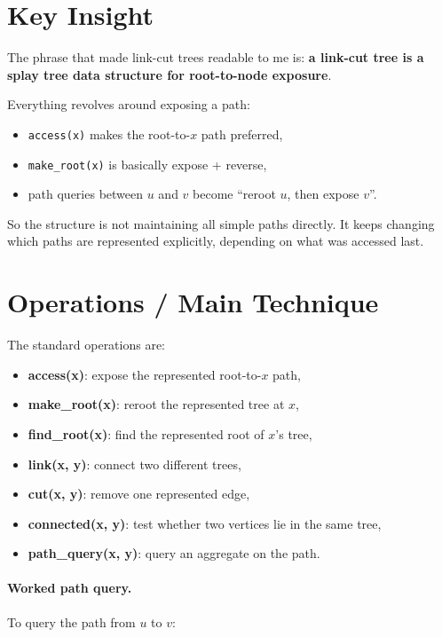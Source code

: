 \section*{Key Insight}

The phrase that made link-cut trees readable to me is:
\textbf{a link-cut tree is a splay tree data structure for root-to-node exposure}.

Everything revolves around exposing a path:

\begin{itemize}
  \item \texttt{access(x)} makes the root-to-\(x\) path preferred,
  \item \texttt{make\_root(x)} is basically expose + reverse,
  \item path queries between \(u\) and \(v\) become ``reroot \(u\), then expose \(v\)''.
\end{itemize}

So the structure is not maintaining all simple paths directly. It keeps changing which paths are represented
explicitly, depending on what was accessed last.

\section*{Operations / Main Technique}

The standard operations are:

\begin{itemize}
  \item \textbf{access(x)}: expose the represented root-to-\(x\) path,
  \item \textbf{make\_root(x)}: reroot the represented tree at \(x\),
  \item \textbf{find\_root(x)}: find the represented root of \(x\)'s tree,
  \item \textbf{link(x, y)}: connect two different trees,
  \item \textbf{cut(x, y)}: remove one represented edge,
  \item \textbf{connected(x, y)}: test whether two vertices lie in the same tree,
  \item \textbf{path\_query(x, y)}: query an aggregate on the path.
\end{itemize}

\paragraph{Worked path query.}
To query the path from \(u\) to \(v\):

